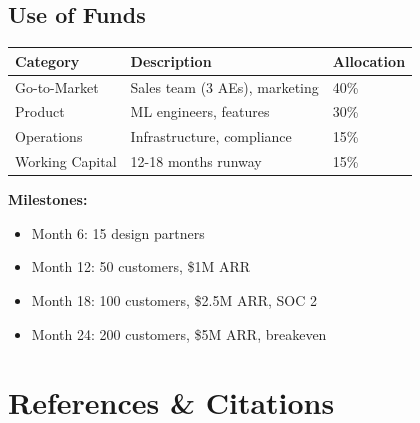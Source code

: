\documentclass[11pt,letterpaper]{article}
\begin{document}
\subsection{Use of Funds}

\begin{table}[H]
\centering
\begin{tabularx}{\textwidth}{lXl}
\toprule
\textbf{Category} & \textbf{Description} & \textbf{Allocation} \\
\midrule
Go-to-Market & Sales team (3 AEs), marketing & 40\% \\
Product & ML engineers, features & 30\% \\
Operations & Infrastructure, compliance & 15\% \\
Working Capital & 12-18 months runway & 15\% \\
\bottomrule
\end{tabularx}
\end{table}

\textbf{Milestones:}
\begin{itemize}[noitemsep]
    \item Month 6: 15 design partners
    \item Month 12: 50 customers, \$1M ARR
    \item Month 18: 100 customers, \$2.5M ARR, SOC 2
    \item Month 24: 200 customers, \$5M ARR, breakeven
\end{itemize}


\newpage
\section*{References \& Citations}
\end{document}
